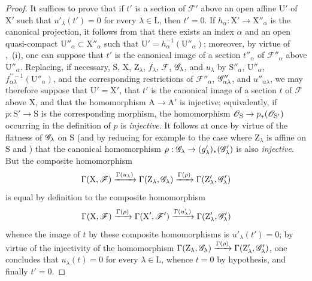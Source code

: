 \begin{proof}
It suffices to prove that if $t'$ is a section of $\mathscr{F}'$ above an open affine $\mathrm{U}'$ of $\mathrm{X}'$ such that $u'_\lambda(t')=0$ for every $\lambda\in\mathrm{L}$, then $t'=0$.
If $h_\alpha:\mathrm{X}'\to\mathrm{X}''_\alpha$ is the canonical projection,
it follows from  that there exists an index $\alpha$ and an open quasi-compact $\mathrm{U}''_\alpha\subset\mathrm{X}''_\alpha$ such that $\mathrm{U}'=h_\alpha^{-1}(\mathrm{U}''_\alpha)$; moreover, by virtue of ,~(i), one can suppose that $t'$ is the canonical image of a section $t''_\alpha$ of $\mathscr{F}''_\alpha$ above $\mathrm{U}''_\alpha$.
Replacing, if necessary, $\mathrm{S}$, $\mathrm{X}$, $\mathrm{Z}_\lambda$, $f_\lambda$, $\mathscr{F}$, $\mathscr{G}_\lambda$, and $u_\lambda$ by $\mathrm{S}''_\alpha$, $\mathrm{U}''_\alpha$, $f^{\prime\prime-1}_{\alpha\lambda}(\mathrm{U}''_\alpha)$, and the corresponding restrictions of $\mathscr{F}''_\alpha$, $\mathscr{G}''_{\alpha\lambda}$, and $u''_{\alpha\lambda}$, we may therefore suppose that $\mathrm{U}'=\mathrm{X}'$, that $t'$ is the canonical image of a section $t$ of $\mathscr{F}$ above $\mathrm{X}$, and that the homomorphism $\mathrm{A}\to\mathrm{A}'$ is injective; equivalently, if $p:\mathrm{S}'\to\mathrm{S}$ is the corresponding morphism, the homomorphism $\mathscr{O}_\mathrm{S}\to p_*(\mathscr{O}_{\mathrm{S}'})$ occurring in the definition of $p$ is \emph{injective}.
It follows at once by virtue of the flatness of $\mathscr{G}_\lambda$ on $\mathrm{S}$ (and by reducing for example to the case where $\mathrm{Z}_\lambda$ is affine on $\mathrm{S}$  and ) that the canonical homomorphism $\rho:\mathscr{G}_\lambda\to(g'_\lambda)_*(\mathscr{G}'_\lambda)$ is also \emph{injective}.
But the composite homomorphism
\[
  \Gamma(\mathrm{X},\mathscr{F})\xrightarrow{\Gamma(u_\lambda)}\Gamma(\mathrm{Z}_\lambda,\mathscr{G}_\lambda)\xrightarrow{\Gamma(\rho)}\Gamma(\mathrm{Z}'_\lambda,\mathscr{G}'_\lambda)
\]
is equal by definition to the composite homomorphism
\[
  \Gamma(\mathrm{X},\mathscr{F})\xrightarrow{\Gamma(\rho)}\Gamma(\mathrm{X}',\mathscr{F}')\xrightarrow{\Gamma(u'_\lambda)}\Gamma(\mathrm{Z}'_\lambda,\mathscr{G}'_\lambda)
\]
whence the image of $t$ by these composite homomorphisms is $u'_\lambda(t')=0$; by virtue of the injectivity of the homomorphism $\Gamma(\mathrm{Z}_\lambda,\mathscr{G}_\lambda)\xrightarrow{\Gamma(\rho)}\Gamma(\mathrm{Z}'_\lambda,\mathscr{G}'_\lambda)$, one concludes that $u_\lambda(t)=0$ for every $\lambda\in\mathrm{L}$, whence $t=0$ by hypothesis, and finally $t'=0$.
\end{proof}

